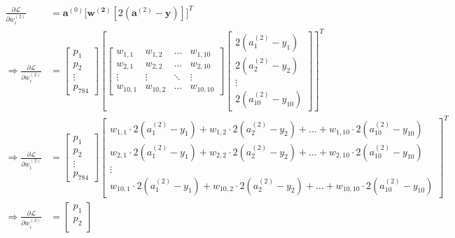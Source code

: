 \documentclass[a4paper,12pt]{article}
\begin{document}
\begin{align*}
\frac{\partial \mathcal{L}}{\partial w_{i}^{(2)}}  &= \mathbf{a}^{(0)} \big [ \mathbf{w^{(2)}} [2(\mathbf{a}^{(2)} - \mathbf{y})] \big ]^{T} \\
\Rightarrow \frac{\partial \mathcal{L}}{\partial w_{i}^{(2)}}  &= 
\begin{bmatrix}
    p_1 \\
    p_2 \\
    \vdots \\
    p_{784}
\end{bmatrix}
\left[
\begin{bmatrix}
w_{1,1} & w_{1,2} & \ldots & w_{1,10} \\
w_{2,1} & w_{2,2} & \ldots & w_{2,10} \\
\vdots & \vdots & \ddots & \vdots \\
w_{10,1} & w_{10,2} & \ldots & w_{10,10}
\end{bmatrix}
\begin{bmatrix}
    2(a_{1}^{(2)} - y_1) \\
     2(a_{2}^{(2)} - y_2)  \\
      \vdots \\ 
       2(a_{10}^{(2)} - y_{10}) 
\end{bmatrix}
\right] ^{T} \\
\Rightarrow  \frac{\partial \mathcal{L}}{\partial w_{i}^{(2)}}  &= 
\begin{bmatrix}
    p_1 \\
    p_2 \\
    \vdots \\
    p_{784}
\end{bmatrix}
\begin{bmatrix}
    w_{1,1} \cdot 2(a_{1}^{(2)} - y_1) + w_{1,2} \cdot 2(a_{2}^{(2)} - y_2) + \ldots + w_{1,10} \cdot 2(a_{10}^{(2)} - y_{10}) \\
    w_{2,1} \cdot 2(a_{1}^{(2)} - y_1) + w_{2,2} \cdot 2(a_{2}^{(2)} - y_2) + \ldots + w_{2,10} \cdot 2(a_{10}^{(2)} - y_{10}) \\
    \vdots \\
    w_{10,1} \cdot 2(a_{1}^{(2)} - y_1) + w_{10,2} \cdot 2(a_{2}^{(2)} - y_2) + \ldots + w_{10,10} \cdot 2(a_{10}^{(2)} - y_{10})
\end{bmatrix} ^{T} \\
\Rightarrow  \frac{\partial \mathcal{L}}{\partial w_{i}^{(2)}}  &= 
\begin{bmatrix}
    p_1 \\
    p_2 \\

\end{bmatrix}
\end{align*}
\end{document}
